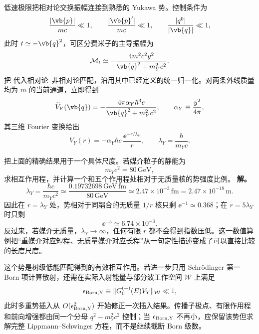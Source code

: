 低速极限把相对论交换振幅连接到熟悉的 Yukawa 势。控制条件为
\begin{equation*}
 \frac{|\vb{p}|}{mc}\ll1,
 \qquad
 \frac{|\vb{p}'|}{mc}\ll1,
 \qquad
 \frac{|q^0|}{|\vb{q}|}\ll1,
\end{equation*}
此时 $t\simeq-\vb{q}^2$，可区分费米子的主导振幅为
\begin{equation}
 \mathcal M_t
 \simeq-\frac{4m^2c^2y^2}{\vb{q}^2+m_Y^2c^2}.
 \label{eq:yukawa-NR-M-si-r10}
\end{equation}
把 代入相对论--非相对论匹配，沿用其中已经定义的统一归一化。对两条外线质量均为 $m$ 的当前通道，立即得到
\begin{equation}
 \widetilde V_Y(\vb{q})
 =-\frac{4\pi\alpha_Y\hbar^3c}
 {\vb{q}^2+m_Y^2c^2},
 \qquad
 \alpha_Y\equiv\frac{y^2}{4\pi},
 \label{eq:yukawa-Vq-si-r10}
\end{equation}
其三维 Fourier 变换给出
\begin{equation}
 {
 V_Y(r)
 =-\alpha_Y\hbar c\,\frac{\ee^{-r/\lambda_Y}}{r},
 \qquad
 \lambda_Y=\frac{\hbar}{m_Yc}.}
 \label{eq:yukawa-potential-SI-r10}
\end{equation}

\begin{exbox}[媒介质量怎样直接变成作用程]
把上面的精确结果用于一个具体尺度。若媒介粒子的静能为
\begin{equation*}
 m_Yc^2=80\,\mathrm{GeV},
\end{equation*}
求相互作用程，并计算一个和五个作用程处相对于无质量核的势强度比例。
\textbf{解。}
\begin{equation*}
 \lambda_Y
 =\frac{\hbar c}{m_Yc^2}
 \simeq\frac{0.19732698\,\mathrm{GeV\,fm}}{80\,\mathrm{GeV}}
 \simeq2.47\times10^{-3}\,\mathrm{fm}
 =2.47\times10^{-18}\,\mathrm m.
\end{equation*}
因此在 $r=\lambda_Y$ 处，势相对于同耦合的无质量 $1/r$ 核只剩 $\ee^{-1}\simeq0.368$；在 $r=5\lambda_Y$ 时只剩
\begin{equation*}
 \ee^{-5}\simeq6.74\times10^{-3}.
\end{equation*}
反过来，若媒介无质量，$\lambda_Y\to\infty$，任何有限 $r$ 都不会得到指数压低。这一数值算例把“重媒介对应短程、无质量媒介对应长程”从一句定性描述变成了可以直接比较的长度尺度。
\end{exbox}

这个势是树级低能匹配得到的有效相互作用。若进一步只用 Schr\"odinger 第一 Born 项计算散射，还需在实际入射能量与部分波工作空间 $\mathcal W$ 上满足
\begin{equation*}
 \epsilon_{\rm Born,Y}
 \equiv
 \|G_0^{(+)}(E)V_Y\|_{\mathcal W}\ll1,
\end{equation*}
此时多重势插入从 $O(\epsilon_{\rm Born,Y}^2)$ 开始修正一次插入结果。传播子极点、有限作用程和前向增强都由同一个分母 $q^2-m_Y^2c^2$ 控制；当 $\epsilon_{\rm Born,Y}$ 不再小，应保留该势但求解完整 Lippmann--Schwinger 方程，而不是继续截断 Born 级数。



